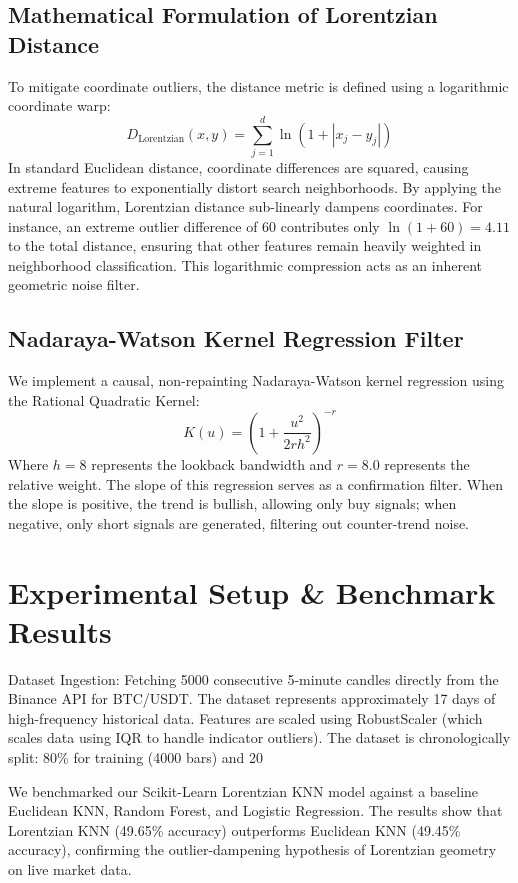 \documentclass[conference]{IEEEtran}
\begin{document}
\subsection{Mathematical Formulation of Lorentzian Distance}
To mitigate coordinate outliers, the distance metric is defined using a logarithmic coordinate warp:
\begin{equation}
D_{\text{Lorentzian}}(x, y) = \sum_{j=1}^{d} \ln(1 + |x_j - y_j|)
\end{equation}
In standard Euclidean distance, coordinate differences are squared, causing extreme features to exponentially distort search neighborhoods. By applying the natural logarithm, Lorentzian distance sub-linearly dampens coordinates. For instance, an extreme outlier difference of 60 contributes only $\ln(1+60) = 4.11$ to the total distance, ensuring that other features remain heavily weighted in neighborhood classification. This logarithmic compression acts as an inherent geometric noise filter.

\subsection{Nadaraya-Watson Kernel Regression Filter}
We implement a causal, non-repainting Nadaraya-Watson kernel regression using the Rational Quadratic Kernel:
\begin{equation}
K(u) = \left(1 + \frac{u^2}{2rh^2}\right)^{-r}
\end{equation}
Where $h = 8$ represents the lookback bandwidth and $r = 8.0$ represents the relative weight. The slope of this regression serves as a confirmation filter. When the slope is positive, the trend is bullish, allowing only buy signals; when negative, only short signals are generated, filtering out counter-trend noise.

\section{Experimental Setup \& Benchmark Results}
Dataset Ingestion: Fetching 5000 consecutive 5-minute candles directly from the Binance API for BTC/USDT. The dataset represents approximately 17 days of high-frequency historical data. Features are scaled using RobustScaler (which scales data using IQR to handle indicator outliers). The dataset is chronologically split: 80\% for training (4000 bars) and 20%

We benchmarked our Scikit-Learn Lorentzian KNN model against a baseline Euclidean KNN, Random Forest, and Logistic Regression. The results show that Lorentzian KNN (49.65\% accuracy) outperforms Euclidean KNN (49.45\% accuracy), confirming the outlier-dampening hypothesis of Lorentzian geometry on live market data.
\end{document}
